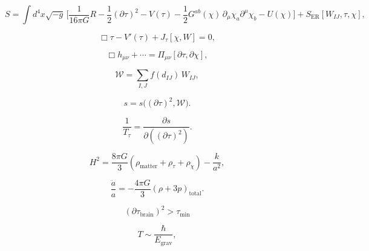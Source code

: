 \[
S = \int d^4x \sqrt{-g}\,\Big[
  \frac{1}{16\pi G}R
  - \frac{1}{2}(\partial\tau)^2
  - V(\tau)
  - \frac{1}{2}G^{ab}(\chi)\,\partial_\mu \chi_a \partial^\mu \chi_b
  - U(\chi)
\Big] + S_{\mathrm{ER}}[W_{IJ},\tau,\chi],
\]

\[
\Box \tau - V'(\tau) + J_\tau[\chi,W] = 0,
\]

\[
\Box h_{\mu\nu} + \cdots = \Pi_{\mu\nu}[\partial\tau,\partial\chi],
\]

\[
\mathcal{W} = \sum_{I,J} f(d_{IJ})\,W_{IJ},
\]

\[
s = s\big((\partial\tau)^2, \mathcal{W}\big).
\]

\[
\frac{1}{T_\tau} = \frac{\partial s}{\partial ((\partial\tau)^2)}.
\]

\[
H^2 = \frac{8\pi G}{3}\left(\rho_{\mathrm{matter}} + \rho_\tau + \rho_\chi\right) - \frac{k}{a^2},
\]

\[
\frac{\ddot a}{a} = -\frac{4\pi G}{3}\left(\rho + 3p\right)_{\mathrm{total}}.
\]

\[
(\partial\tau_{\mathrm{brain}})^2 > \tau_{\min}
\]

\[
T \sim \frac{\hbar}{E_{\mathrm{grav}}},
\]

